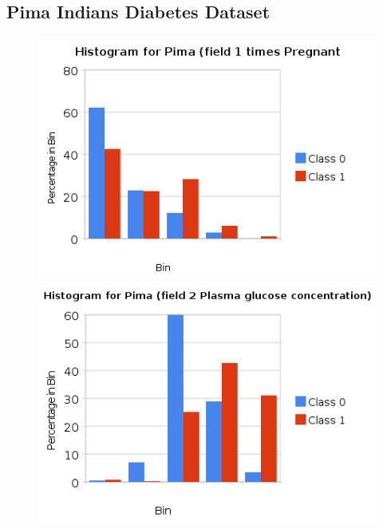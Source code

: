 \documentclass[a4paper,10pt]{article}
\begin{document}
        \newpage
        \subsection{Pima Indians Diabetes Dataset}
 
        \begin{figure}[ht!]
          \begin{minipage}[b]{0.5\linewidth}
            \includegraphics[scale=0.45]{charts/PimaPics/P1.png}
          \end{minipage}
          \begin{minipage}[b]{0.5\linewidth}
             \includegraphics[scale=0.45]{charts/PimaPics/P2.png}
          \end{minipage}
        \end{figure}
\end{document}
